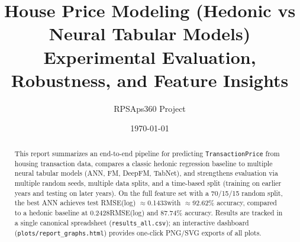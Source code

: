 \documentclass[11pt]{article}
\title{House Price Modeling (Hedonic vs Neural Tabular Models)\\
\large Experimental Evaluation, Robustness, and Feature Insights}
\author{RPSAps360 Project}
\date{\today}
\newcommand{\BestAnnTestRmse}{0.1433}
\newcommand{\BestAnnTestAcc}{92.62}
\newcommand{\BestHedTestRmse}{0.2428}
\newcommand{\BestHedTestAcc}{87.74}
\begin{document}
\maketitle

\begin{abstract}
This report summarizes an end-to-end pipeline for predicting \texttt{TransactionPrice} from housing transaction data, compares a classic hedonic regression baseline to multiple neural tabular models (ANN, FM, DeepFM, TabNet), and strengthens evaluation via multiple random seeds, multiple data splits, and a time-based split (training on earlier years and testing on later years). On the full feature set with a 70/15/15 random split, the best ANN achieves test RMSE(log) \(\approx\)\BestAnnTestRmse with \(\approx\)\BestAnnTestAcc\% accuracy, compared to a hedonic baseline at \BestHedTestRmse RMSE(log) and \BestHedTestAcc\% accuracy. Results are tracked in a single canonical spreadsheet (\texttt{results\_all.csv}); an interactive dashboard (\texttt{plots/report\_graphs.html}) provides one-click PNG/SVG exports of all plots.
\end{abstract}

\tableofcontents
\newpage
\end{document}
